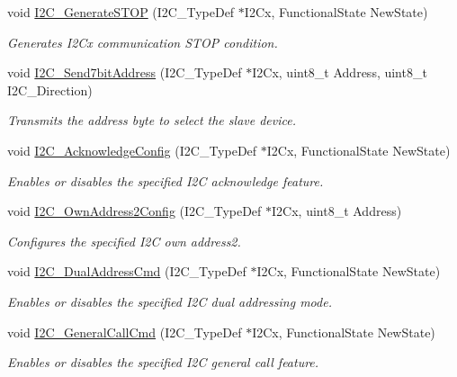 \begin{DoxyCompactItemize}
void \hyperlink{group___i2_c_ga5c92cb573ca0ae58cc465e5400246561}{I2\-C\-\_\-\-Generate\-S\-T\-O\-P} (I2\-C\-\_\-\-Type\-Def $\ast$I2\-Cx, Functional\-State New\-State)
\begin{DoxyCompactList}\small\item\em Generates I2\-Cx communication S\-T\-O\-P condition. \end{DoxyCompactList}\item 
void \hyperlink{group___i2_c_ga009fc2a5b2313c36da39ece39a1156a6}{I2\-C\-\_\-\-Send7bit\-Address} (I2\-C\-\_\-\-Type\-Def $\ast$I2\-Cx, uint8\-\_\-t Address, uint8\-\_\-t I2\-C\-\_\-\-Direction)
\begin{DoxyCompactList}\small\item\em Transmits the address byte to select the slave device. \end{DoxyCompactList}\item 
void \hyperlink{group___i2_c_ga7bb44e894d68a7991f564c43fb187486}{I2\-C\-\_\-\-Acknowledge\-Config} (I2\-C\-\_\-\-Type\-Def $\ast$I2\-Cx, Functional\-State New\-State)
\begin{DoxyCompactList}\small\item\em Enables or disables the specified I2\-C acknowledge feature. \end{DoxyCompactList}\item 
void \hyperlink{group___i2_c_ga7be2cc634a613c8e3539137e897a22df}{I2\-C\-\_\-\-Own\-Address2\-Config} (I2\-C\-\_\-\-Type\-Def $\ast$I2\-Cx, uint8\-\_\-t Address)
\begin{DoxyCompactList}\small\item\em Configures the specified I2\-C own address2. \end{DoxyCompactList}\item 
void \hyperlink{group___i2_c_ga02145a333a56e79557d6ef4ea03fc313}{I2\-C\-\_\-\-Dual\-Address\-Cmd} (I2\-C\-\_\-\-Type\-Def $\ast$I2\-Cx, Functional\-State New\-State)
\begin{DoxyCompactList}\small\item\em Enables or disables the specified I2\-C dual addressing mode. \end{DoxyCompactList}\item 
void \hyperlink{group___i2_c_ga65c740fc8d7b3b9f15cc432d8699d471}{I2\-C\-\_\-\-General\-Call\-Cmd} (I2\-C\-\_\-\-Type\-Def $\ast$I2\-Cx, Functional\-State New\-State)
\begin{DoxyCompactList}\small\item\em Enables or disables the specified I2\-C general call feature. \end{DoxyCompactList}\item 

\end{DoxyCompactItemize}
